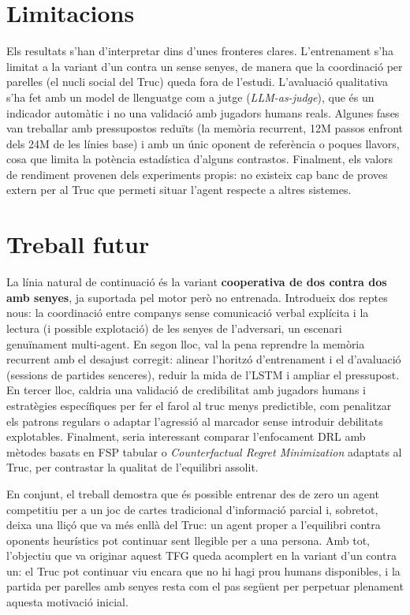 \section{Limitacions}

Els resultats s'han d'interpretar dins d'unes fronteres clares. L'entrenament s'ha limitat a
la variant d'un contra un sense senyes, de manera que la coordinació per parelles (el nucli
social del Truc) queda fora de l'estudi. L'avaluació qualitativa s'ha fet amb un model de
llenguatge com a jutge (\emph{LLM-as-judge}), que és un indicador automàtic i no una
validació amb jugadors humans reals. Algunes fases van treballar amb pressupostos reduïts
(la memòria recurrent, 12M passos enfront dels 24M de les línies base) i amb un únic
oponent de referència o poques llavors, cosa que limita la potència estadística d'alguns
contrastos. Finalment, els valors de rendiment provenen dels experiments propis: no
existeix cap banc de proves extern per al Truc que permeti situar l'agent respecte a
altres sistemes.

\section{Treball futur}

La línia natural de continuació és la variant \textbf{cooperativa de dos contra dos amb
senyes}, ja suportada pel motor però no entrenada. Introdueix dos reptes nous: la
coordinació entre companys sense comunicació verbal explícita i la lectura (i possible
explotació) de les senyes de l'adversari, un escenari genuïnament multi-agent. En segon
lloc, val la pena reprendre la memòria recurrent amb el desajust corregit: alinear
l'horitzó d'entrenament i el d'avaluació (sessions de partides senceres), reduir la mida de
l'\ac{LSTM} i ampliar el pressupost. En tercer lloc, caldria una validació de credibilitat
amb jugadors humans i estratègies específiques per fer el farol al truc menys predictible,
com penalitzar els patrons regulars o adaptar l'agressió al marcador sense introduir
debilitats explotables. Finalment, seria interessant comparar l'enfocament \ac{DRL} amb
mètodes basats en \ac{FSP} tabular o \emph{Counterfactual Regret Minimization} adaptats al
Truc, per contrastar la qualitat de l'equilibri assolit.

En conjunt, el treball demostra que és possible entrenar des de zero un agent competitiu
per a un joc de cartes tradicional d'informació parcial i, sobretot, deixa una lliçó que va
més enllà del Truc: un agent proper a l'equilibri contra oponents heurístics pot continuar
sent llegible per a una persona. Amb tot, l'objectiu que va originar aquest \ac{TFG} queda
acomplert en la variant d'un contra un: el Truc pot continuar viu encara que no hi hagi prou
humans disponibles, i la partida per parelles amb senyes resta com el pas següent per
perpetuar plenament aquesta motivació inicial.

